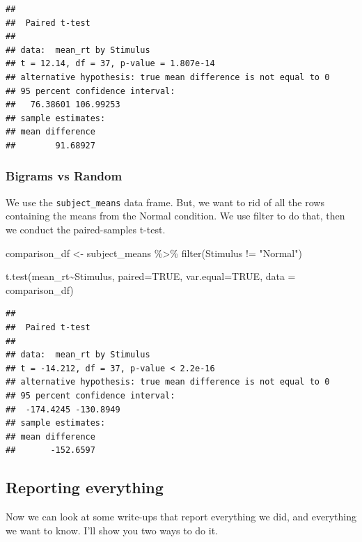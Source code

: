 \documentclass[
]{book}
\newenvironment{Shaded}{\begin{snugshade}}{\end{snugshade}}
\newcommand{\AttributeTok}[1]{\textcolor[rgb]{0.77,0.63,0.00}{#1}}
\newcommand{\ConstantTok}[1]{\textcolor[rgb]{0.00,0.00,0.00}{#1}}
\newcommand{\FunctionTok}[1]{\textcolor[rgb]{0.00,0.00,0.00}{#1}}
\newcommand{\NormalTok}[1]{#1}
\newcommand{\OtherTok}[1]{\textcolor[rgb]{0.56,0.35,0.01}{#1}}
\newcommand{\SpecialCharTok}[1]{\textcolor[rgb]{0.00,0.00,0.00}{#1}}
\newcommand{\StringTok}[1]{\textcolor[rgb]{0.31,0.60,0.02}{#1}}
\begin{document}
\begin{verbatim}
## 
##  Paired t-test
## 
## data:  mean_rt by Stimulus
## t = 12.14, df = 37, p-value = 1.807e-14
## alternative hypothesis: true mean difference is not equal to 0
## 95 percent confidence interval:
##   76.38601 106.99253
## sample estimates:
## mean difference 
##        91.68927
\end{verbatim}

\hypertarget{bigrams-vs-random}{%
\subsubsection{Bigrams vs Random}\label{bigrams-vs-random}}

We use the \texttt{subject\_means} data frame. But, we want to rid of all the rows containing the means from the Normal condition. We use filter to do that, then we conduct the paired-samples t-test.

\begin{Shaded}
\begin{Highlighting}[]
\NormalTok{comparison\_df }\OtherTok{\textless{}{-}}\NormalTok{ subject\_means }\SpecialCharTok{\%\textgreater{}\%}
                  \FunctionTok{filter}\NormalTok{(Stimulus }\SpecialCharTok{!=} \StringTok{"Normal"}\NormalTok{)}

\FunctionTok{t.test}\NormalTok{(mean\_rt}\SpecialCharTok{\textasciitilde{}}\NormalTok{Stimulus, }
       \AttributeTok{paired=}\ConstantTok{TRUE}\NormalTok{, }
       \AttributeTok{var.equal=}\ConstantTok{TRUE}\NormalTok{, }
       \AttributeTok{data =}\NormalTok{ comparison\_df)}
\end{Highlighting}
\end{Shaded}

\begin{verbatim}
## 
##  Paired t-test
## 
## data:  mean_rt by Stimulus
## t = -14.212, df = 37, p-value < 2.2e-16
## alternative hypothesis: true mean difference is not equal to 0
## 95 percent confidence interval:
##  -174.4245 -130.8949
## sample estimates:
## mean difference 
##       -152.6597
\end{verbatim}

\hypertarget{reporting-everything}{%
\subsection{Reporting everything}\label{reporting-everything}}

Now we can look at some write-ups that report everything we did, and everything we want to know. I'll show you two ways to do it.
\end{document}
